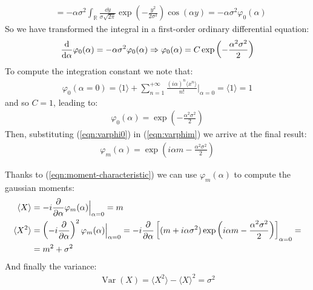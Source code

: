 \documentclass[../template.tex]{subfiles}
\begin{document}
\begin{example}
\begin{align*}
        &= -\alpha\sigma^2 \int_{\mathbb{R}} \frac{\dd{y}}{\sigma \sqrt{2 \pi}}\exp\left(-\frac{y^2}{2 \sigma^2} \right) \cos(\alpha y) = -\alpha\sigma^2 \varphi_0(\alpha)
    \end{align*}
    So we have transformed the integral in a first-order ordinary differential equation:
    \begin{align*}
        \dv{\alpha} \varphi_0(\alpha) = - \alpha \sigma^2 \varphi_0(\alpha) \Rightarrow \varphi_0(\alpha) = C \exp\left(-\frac{\alpha^2 \sigma^2}{2} \right)
    \end{align*}
    To compute the integration constant we note that:
    \begin{align*}
        \varphi_0(\alpha = 0) = \langle 1 \rangle + \sum_{n=1}^{+\infty} \frac{(i \alpha)^n \langle x^n \rangle}{n!} \Big|_{\alpha = 0} = \langle 1 \rangle = 1
    \end{align*}
    and so $C=1$, leading to:
    \begin{align}\label{eqn:varphi0}
        \varphi_0(\alpha) = \exp\left(-\frac{\alpha^2 \sigma^2}{2} \right)
    \end{align}
    Then, substituting (\ref{eqn:varphi0}) in (\ref{eqn:varphim}) we arrive at the final result:
    \begin{align*}
        \varphi_m(\alpha) = \exp(i \alpha m - \frac{\alpha^2 \sigma^2}{2} )
    \end{align*}

    Thanks to (\ref{eqn:moment-characteristic}) we can use $\varphi_m(\alpha)$ to compute the gaussian moments:
    \begin{align*}
        \langle X \rangle &= -i \pdv{\alpha} \varphi_{m}(\alpha) \Big|_{\alpha = 0} = m\\
        \langle X^2 \rangle &= \left(-i \pdv{\alpha}\right)^2 \varphi_m(\alpha) \Big|_{\alpha=0} = -i\pdv{\alpha} \left[(m + i \alpha \sigma^2) \exp\left(i \alpha m - \frac{\alpha^2 \sigma^2}{2} \right)\right]_{\alpha = 0}=\\
        &= m^2 + \sigma^2
    \end{align*}
    And finally the variance:
    \begin{align*}
        \operatorname{Var}(X) = \langle X^2 \rangle - \langle X \rangle^2 = \sigma^2
    \end{align*}
\end{example}
\end{document}
